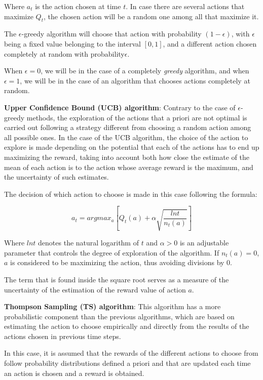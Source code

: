 \documentclass[../main.tex]{subfiles}
\begin{document}
Where $a_{t}$ is the action chosen at time $t$. In case there are several actions that
maximize $Q_{t}$, the chosen action will be a random one among all that maximize it.  

The $\epsilon$-greedy algorithm will choose that action with probability 
$\left(1 - \epsilon\right)$, with $\epsilon$ being a fixed value belonging to the
interval $\left[0, 1\right]$, and a different action chosen completely at random with
probability$\epsilon$.  

When $\epsilon = 0$, we will be in the case of a completely \textit{greedy} algorithm,
and when $\epsilon = 1$, we will be in the case of an algorithm that chooses actions
completely at random.  

\textbf{Upper Confidence Bound (UCB) algorithm}: Contrary to the case of 
$\epsilon$-greedy methods, the exploration of the actions that a priori are not
optimal is carried out following a strategy different from choosing a random action
among all possible ones. In the case of the UCB algorithm, the choice of the action to
explore is made depending on the potential that each of the actions has to end up
maximizing the reward, taking into account both how close the estimate of the mean of
each action is to the action whose average reward is the maximum, and the uncertainty
of such estimates.  

The decision of which action to choose is made in this case following the formula:  

\begin{equation*}
    a_{t} = argmax_{a}\left[Q_{t}\left(a\right) + \alpha \sqrt{\dfrac{ln t}{n_{t}\left(a\right)}}\right]
\end{equation*}

Where $ln t$ denotes the natural logarithm of $t$ and $\alpha > 0$ is an adjustable 
parameter that controls the degree of exploration of the algorithm. If 
$n_{t}\left(a\right) = 0$, $a$ is considered to be maximizing the action, thus avoiding 
divisions by 0.  

The term that is found inside the square root serves as a measure of the uncertainty 
of the estimation of the reward value of action $a$.  

\textbf{Thompson Sampling (TS) algorithm}: This algorithm has a more probabilistic 
component than the previous algorithms, which are based on estimating the action to 
choose empirically and directly from the results of the actions chosen in previous 
time steps.  

In this case, it is assumed that the rewards of the different actions to choose from 
follow probability distributions defined a priori and that are updated each time an 
action is chosen and a reward is obtained.  
\end{document}
